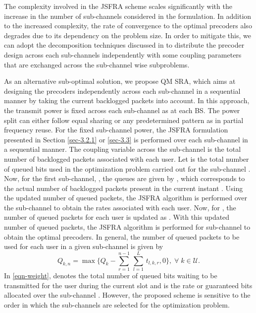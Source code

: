 
The complexity involved in the \ac{JSFRA} scheme scales significantly with the increase in the number of sub-channels considered in the formulation. In addition to the increased complexity, the rate of convergence to the optimal precoders also degrades due to its dependency on the problem size. In order to mitigate this, we can adopt the decomposition techniques discussed in \cite{palomar2006tutorial,boyd2011distributed} to distribute the precoder design across each sub-channels independently with some coupling parameters that are exchanged across the sub-channel wise subproblems. 

As an alternative sub-optimal solution, we propose \acl{QM} \ac{SRA}, which aims at designing the precoders independently across each sub-channel in a sequential manner by taking the current backlogged packets into account. In this approach, the transmit power is fixed across each sub-channel  as  at each \ac{BS}. The power split can either follow equal sharing or any predetermined pattern as in partial frequency reuse. For the fixed sub-channel power, the \ac{JSFRA} formulation presented in Section \ref{sec-3.2.1} or \ref{sec-3.3} is performed over each sub-channel in a sequential manner. The coupling variable across the sub-channel is the total number of backlogged packets associated with each user. 
Let  is the total number of queued bits used in the optimization problem carried out for the sub-channel . Now, for the first sub-channel, , the queues are given by , which corresponds to the actual number of backlogged packets present in the current instant . Using the updated number of queued packets, the \ac{JSFRA} algorithm is performed over the sub-channel  to obtain the rates associated with each user. Now, for , the number of queued packets for each user is updated as . With this updated number of queued packets, the \ac{JSFRA} algorithm is performed for  sub-channel to obtain the optimal precoders. In general, the number of queued packets to be used for each user in a given sub-channel  is given by
\begin{equation}
Q_{k,n} = \max{\Big \lbrace Q_k - \sum_{r = 1}^{n-1} \, \sum_{l = 1}^{L} \, t_{l,k,r} ,0 \Big \rbrace }, \; \forall \; k \in \mathcal{U}.
\label{eqn-weight}
\end{equation}
In \eqref{eqn-weight},  denotes the total number of queued bits waiting to be transmitted for the user  during the current slot and  is the rate or guaranteed bits allocated over the sub-channel . However, the proposed scheme is sensitive to the order in which the sub-channels are selected for the optimization problem.

